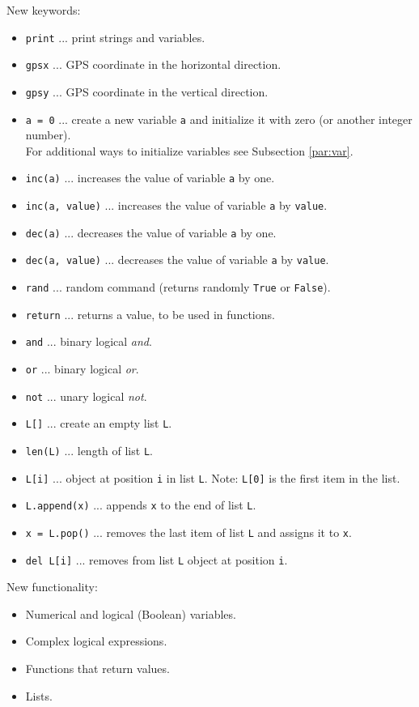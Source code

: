 New keywords:
\begin{itemize}
\item {\tt print} ... print strings and variables.
\item {\tt gpsx} ... GPS coordinate in the horizontal direction.
\item {\tt gpsy} ... GPS coordinate in the vertical direction.
\item {\tt a = 0} ... create a new variable {\tt a} and initialize it with zero (or another 
      integer number).\\ For additional ways to initialize variables see Subsection \ref{par:var}.
\item {\tt inc(a)} ... increases the value of variable {\tt a} by one.
\item {\tt inc(a, value)} ... increases the value of variable {\tt a} by {\tt value}.
\item {\tt dec(a)} ... decreases the value of variable {\tt a} by one.
\item {\tt dec(a, value)} ... decreases the value of variable {\tt a} by {\tt value}.
\item {\tt rand} ... random command (returns randomly {\tt True} or {\tt False}).
\item {\tt return} ... returns a value, to be used in functions.
\item {\tt and} ... binary logical {\em and}.
\item {\tt or} ... binary logical {\em or}.
\item {\tt not} ... unary logical {\em not}.
\item {\tt L[]} ... create an empty list {\tt L}.
\item {\tt len(L)} ... length of list {\tt L}.
\item {\tt L[i]} ... object at position {\tt i} in list {\tt L}. Note: {\tt L[0]} is the first item in the list.
\item {\tt L.append(x)} ... appends {\tt x} to the end of list {\tt L}.
\item {\tt x = L.pop()} ... removes the last item of list {\tt L} and assigns it to {\tt x}.
\item {\tt del L[i]} ... removes from list {\tt L} object at position {\tt i}. 
\end{itemize}
New functionality:
\begin{itemize}
\item Numerical and logical (Boolean) variables.
\item Complex logical expressions.
\item Functions that return values.
\item Lists.
\end{itemize}

